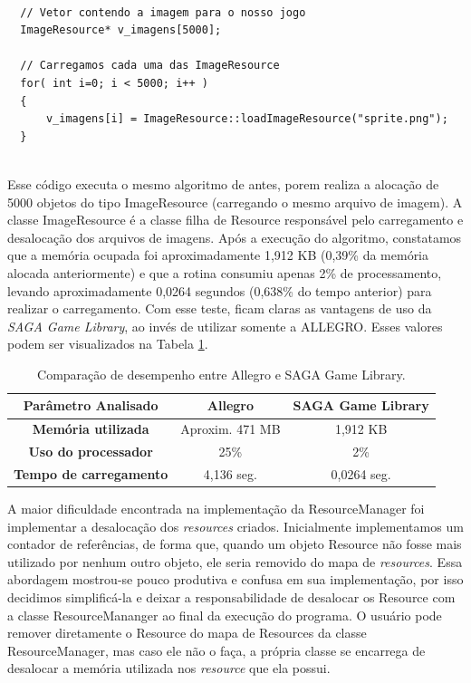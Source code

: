 %
%
\begin{lstlisting}

  // Vetor contendo a imagem para o nosso jogo
  ImageResource* v_imagens[5000];
	
  // Carregamos cada uma das ImageResource
  for( int i=0; i < 5000; i++ )
  {
      v_imagens[i] = ImageResource::loadImageResource("sprite.png");
  }
	      
\end{lstlisting}
%
\par 
Esse código executa o mesmo algoritmo de antes, porem realiza a alocação de 5000 objetos do tipo ImageResource (carregando o mesmo arquivo de imagem). A classe ImageResource é a classe filha de Resource responsável pelo carregamento e desalocação dos arquivos de imagens. Após a execução do algoritmo, constatamos que a memória ocupada foi aproximadamente 1,912 KB (0,39\% da memória alocada anteriormente) e que a rotina consumiu apenas 2\% de processamento, levando aproximadamente 0,0264 segundos (0,638\% do tempo anterior) para realizar o carregamento. Com esse teste, ficam claras as vantagens de uso da \textit{SAGA Game Library}, ao invés de utilizar somente a ALLEGRO. Esses valores podem ser visualizados na Tabela \ref{tabelaEconomia}.
%
% 
\begin{table}[H]
\centering
\caption{Comparação de desempenho entre Allegro e SAGA Game Library.}
\begin{tabular}{|c|c|c|}\hline
\textbf{Parâmetro Analisado} & \textbf{Allegro} & \textbf{SAGA Game Library}\\\hline
\textbf{Memória utilizada} & Aproxim. 471 MB & 1,912 KB\\\hline
\textbf{Uso do processador} & 25\% & 2\% \\\hline
\textbf{Tempo de carregamento} & 4,136 seg. & 0,0264 seg.\\\hline
\end{tabular}
\label{tabelaEconomia}
\end{table}
%
%
\par
A maior dificuldade encontrada na implementação da ResourceManager foi implementar a desalocação dos \textit{resources} criados. Inicialmente implementamos um contador de referências, de forma que, quando um objeto Resource não fosse mais utilizado por nenhum outro objeto, ele seria removido do mapa de \textit{resources}. Essa abordagem mostrou-se pouco produtiva e confusa em sua implementação, por isso decidimos simplificá-la e deixar a responsabilidade de desalocar os Resource com a classe ResourceMananger ao final da execução do programa. O usuário pode remover diretamente o Resource do mapa de Resources da classe ResourceManager, mas caso ele não o faça, a própria classe se encarrega de desalocar a memória utilizada nos \textit{resource} que ela possui.
%
%
%
